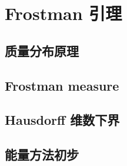 \section{Frostman 引理}
\label{b1:sec:1504}


\subsection{质量分布原理}
\label{b1:subsec:150401}

\subsection{Frostman measure}
\label{b1:subsec:150402}

\subsection{Hausdorff 维数下界}
\label{b1:subsec:150403}

\subsection{能量方法初步}
\label{b1:subsec:150404}



